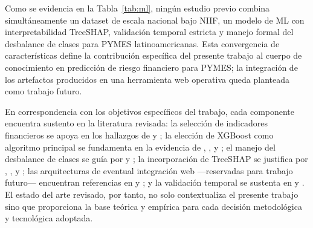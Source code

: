 \documentclass[12pt, letterpaper]{article}
\begin{document}
Como se evidencia en la Tabla~\ref{tab:ml}, ning\'un estudio previo combina simult\'aneamente un dataset de escala nacional bajo NIIF, un modelo de ML con interpretabilidad TreeSHAP, validaci\'on temporal estricta y manejo formal del desbalance de clases para PYMES latinoamericanas. Esta convergencia de caracter\'isticas define la contribuci\'on espec\'ifica del presente trabajo al cuerpo de conocimiento en predicci\'on de riesgo financiero para PYMES; la integraci\'on de los artefactos producidos en una herramienta web operativa queda planteada como trabajo futuro.

En correspondencia con los objetivos espec\'ificos del trabajo, cada componente encuentra sustento en la literatura revisada: la selecci\'on de indicadores financieros se apoya en los hallazgos de \citet{Cultrera2016} y \citet{PtakChmielewska2020}; la elecci\'on de XGBoost como algoritmo principal se fundamenta en la evidencia de \citet{Dasilas2024}, \citet{Boumhidi2025}, \citet{Sujatha2025} y \citet{ChenGuestrin2016}; el manejo del desbalance de clases se gu\'ia por \citet{Sun2020} y \citet{Kristanti2025}; la incorporaci\'on de TreeSHAP se justifica por \citet{Bussmann2020}, \citet{Pathi2025}, \citet{LundbergTreeSHAP2020} y \citet{Deng2024}; las arquitecturas de eventual integraci\'on web ---reservadas para trabajo futuro--- encuentran referencias en \citet{MayorgaLira2023} y \citet{BaumontDeOliveira2021}; y la validaci\'on temporal se sustenta en \citet{Bortolotti2024} y \citet{Mahesh2025}. El estado del arte revisado, por tanto, no solo contextualiza el presente trabajo sino que proporciona la base te\'orica y emp\'irica para cada decisi\'on metodol\'ogica y tecnol\'ogica adoptada.


\end{document}
